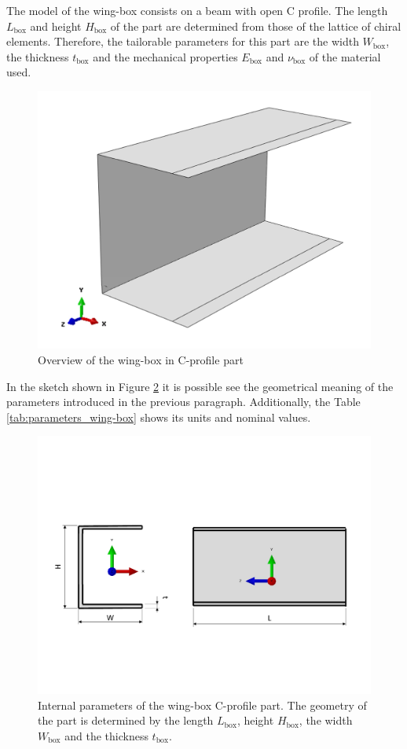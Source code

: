     The model of the wing-box consists on a beam with open C profile. The length $L_{\mathrm{box}}$ and height $H_{\mathrm{box}}$ of the part are determined from those of the lattice of chiral elements. Therefore, the tailorable parameters for this part are the width $W_{\mathrm{box}}$, the thickness $t_{\mathrm{box}}$ and the mechanical properties $E_{\mathrm{box}}$ and $\nu_{\mathrm{box}}$ of the material used.

    \begin{figure}[!htpb]
      \centering
      \includegraphics[width=0.6 \textwidth]{figures/model/wing-box}
      \caption[Overview of the wing-box in C-profile part]{Overview of the wing-box in C-profile part}\label{fig:wing-box}
    \end{figure}

    In the sketch shown in Figure \ref{fig:wing-box-internalParameters} it is possible see the geometrical meaning of the parameters introduced in the previous paragraph. Additionally, the Table \ref{tab:parameters_wing-box} shows its units and nominal values.

    \begin{figure}[!htpb]
      \centering
      \includegraphics[width=0.8 \textwidth]{figures/model/wing-box-internalParameters}
      \caption[Internal parameters of the wing-box in C-profile part]{Internal parameters of the wing-box C-profile part. The geometry of the part is determined by the length $L_{\mathrm{box}}$, height $H_{\mathrm{box}}$, the width $W_{\mathrm{box}}$ and the thickness $t_{\mathrm{box}}$.}\label{fig:wing-box-internalParameters}
    \end{figure}

